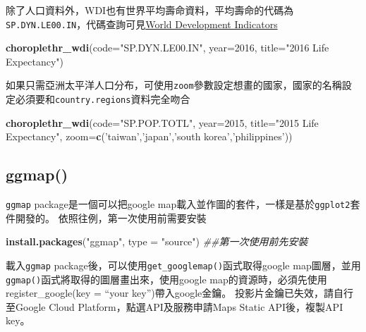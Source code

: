 \documentclass[
]{book}
\newenvironment{Shaded}{\begin{snugshade}}{\end{snugshade}}
\newcommand{\CommentTok}[1]{\textcolor[rgb]{0.56,0.35,0.01}{\textit{#1}}}
\newcommand{\DataTypeTok}[1]{\textcolor[rgb]{0.13,0.29,0.53}{#1}}
\newcommand{\DecValTok}[1]{\textcolor[rgb]{0.00,0.00,0.81}{#1}}
\newcommand{\KeywordTok}[1]{\textcolor[rgb]{0.13,0.29,0.53}{\textbf{#1}}}
\newcommand{\NormalTok}[1]{#1}
\newcommand{\StringTok}[1]{\textcolor[rgb]{0.31,0.60,0.02}{#1}}
\begin{document}
除了人口資料外，WDI也有世界平均壽命資料，平均壽命的代碼為\texttt{SP.DYN.LE00.IN}，代碼查詢可見\href{http://beta.data.worldbank.org/}{World Development Indicators}

\begin{Shaded}
\begin{Highlighting}[]
\KeywordTok{choroplethr_wdi}\NormalTok{(}\DataTypeTok{code=}\StringTok{"SP.DYN.LE00.IN"}\NormalTok{, }\DataTypeTok{year=}\DecValTok{2016}\NormalTok{, }
                \DataTypeTok{title=}\StringTok{"2016 Life Expectancy"}\NormalTok{)}
\end{Highlighting}
\end{Shaded}

如果只需亞洲太平洋人口分布，可使用\texttt{zoom}參數設定想畫的國家，國家的名稱設定必須要和\texttt{country.regions}資料完全吻合

\begin{Shaded}
\begin{Highlighting}[]
\KeywordTok{choroplethr_wdi}\NormalTok{(}\DataTypeTok{code=}\StringTok{"SP.POP.TOTL"}\NormalTok{, }\DataTypeTok{year=}\DecValTok{2015}\NormalTok{, }
                \DataTypeTok{title=}\StringTok{"2015 Life Expectancy"}\NormalTok{,}
                \DataTypeTok{zoom=}\KeywordTok{c}\NormalTok{(}\StringTok{'taiwan'}\NormalTok{,}\StringTok{'japan'}\NormalTok{,}\StringTok{'south korea'}\NormalTok{,}\StringTok{'philippines'}\NormalTok{))}
\end{Highlighting}
\end{Shaded}

\hypertarget{ggmap}{%
\subsection{ggmap()}\label{ggmap}}

\texttt{ggmap}\citep{R-ggmap} package是一個可以把google map載入並作圖的套件，一樣是基於\texttt{ggplot2}套件開發的。
依照往例，第一次使用前需要安裝

\begin{Shaded}
\begin{Highlighting}[]
\KeywordTok{install.packages}\NormalTok{(}\StringTok{"ggmap"}\NormalTok{, }\DataTypeTok{type =} \StringTok{"source"}\NormalTok{) }\CommentTok{##第一次使用前先安裝}
\end{Highlighting}
\end{Shaded}

載入\texttt{ggmap}\citep{R-ggmap} package後，可以使用\texttt{get\_googlemap()}函式取得google map圖層，並用\texttt{ggmap()}函式將取得的圖層畫出來，使用google map的資源時，必須先使用register\_google(key = ``your key'')帶入google金鑰。
投影片金鑰已失效，請自行至Google Cloud Platform，點選API及服務申請Maps Static API後，複製API key。
\end{document}
